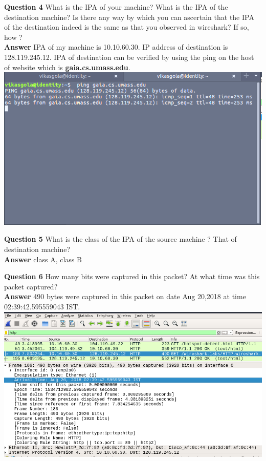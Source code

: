 \documentclass[14pt]{extarticle}
\begin{document}
    \noindent
    \textbf{\large Question 4}
    What is the IPA of your machine? What is the IPA of the destination machine? Is there any
    way by which you can ascertain that the IPA of the destination indeed is the same as that
    you observed in wireshark? If so, how ?\\[10pt]
    \textbf{\large Answer}
    IPA of my machine is 10.10.60.30. IP address of destination is 128.119.245.12. 
    IPA of destination can be verified by using the ping on the host of website which is \textbf{gaia.cs.umass.edu}.\\
    \includegraphics[scale=0.6]{4}
    \vspace{1cm}

    \noindent
    \textbf{\large Question 5}
    What is the class of the IPA of the source machine ? That of destination machine?\\[10pt]
    \textbf{\large Answer}
    class A, class B
    \vspace{1cm}

    \noindent
    \textbf{\large Question 6}
    How many bits were captured in this packet? At what time was this packet captured?\\[10pt]
    \textbf{\large Answer}
    490 bytes were captured in this packet on date Aug 20,2018 at time 02:39:42.595559043 IST.\\[10pt]
    \includegraphics[scale=0.48]{6}
    \vspace{1cm}
\end{document}
